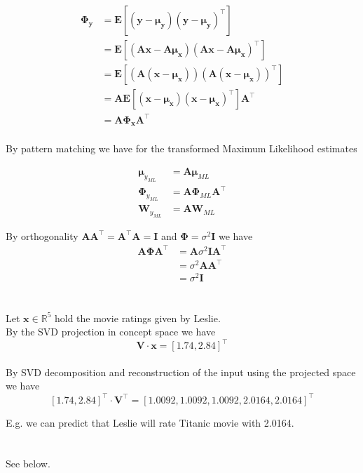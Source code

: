 \documentclass[11pt]{article}
\newcommand{\exercise}{\section{}}
\newcommand{\tf}[1]{{#1}^{\intercal}}
\begin{document}
\begin{align*}
\mathbf{\Phi_y} &= \mathbf{E}[ (\mathbf{y} - \mathbf{\mu_y}) \tf{(\mathbf{y} - \mathbf{\mu_y})} ] \\
&= \mathbf{E}[ ( \mathbf{A} \mathbf{x} - \mathbf{A} \mathbf{\mu_x} ) \tf{( \mathbf{A} \mathbf{x} - \mathbf{A} \mathbf{\mu_x} ) } ] \\
&= \mathbf{E}[ ( \mathbf{A} (\mathbf{x} - \mathbf{\mu_x}) ) \tf{( \mathbf{A} (\mathbf{x} - \mathbf{\mu_x}) ) } ] \\
&= \mathbf{A} \mathbf{E}[ ( \mathbf{x} - \mathbf{\mu_x} ) \tf{( \mathbf{x} - \mathbf{\mu_x} ) } ] \tf{\mathbf{A}} \\
&= \mathbf{A} \mathbf{\Phi_x} \tf{\mathbf{A}} \\
\end{align*}

\noindent By pattern matching we have for the transformed Maximum Likelihood estimates

\begin{align*}
\mathbf{\mu}_{y_{ML}} &= \mathbf{A} \mathbf{\mu}_{ML} \\
\mathbf{\Phi}_{y_{ML}} &= \mathbf{A} \mathbf{\Phi}_{ML} \tf{\mathbf{A}} \\
\mathbf{W}_{y_{ML}} &= \mathbf{A} \mathbf{W}_{ML}
\end{align*}

\noindent By orthogonality $ \mathbf{A} \tf{\mathbf{A}} = \tf{\mathbf{A}} \mathbf{A} = \mathbf{I}$ and $ \mathbf{\Phi} = \sigma^2  \mathbf{I}$ we have
\begin{align*}
\mathbf{A} \mathbf{\Phi} \tf{\mathbf{A}} &= \mathbf{A} \sigma^2  \mathbf{I} \tf{\mathbf{A}} \\
&= \sigma^2 \mathbf{A} \tf{\mathbf{A}} \\
&= \sigma^2 \mathbf{I}
\end{align*}

\exercise

Let $\mathbf{x} \in \mathbb{R}^5$ hold the movie ratings given by Leslie.
\\
\noindent By the SVD projection in concept space we have
$$\mathbf{V}  \cdot \mathbf{x} = \tf{[1.74, 2.84]}$$
\\
\noindent By SVD decomposition and reconstruction of the input using the projected space we have
$$ \tf{[1.74, 2.84]} \cdot \tf{\mathbf{V}} = \tf{[1.0092, 1.0092, 1.0092, 2.0164, 2.0164]} $$

\noindent E.g. we can predict that Leslie will rate Titanic movie with 2.0164.

\exercise

See below.
\end{document}
